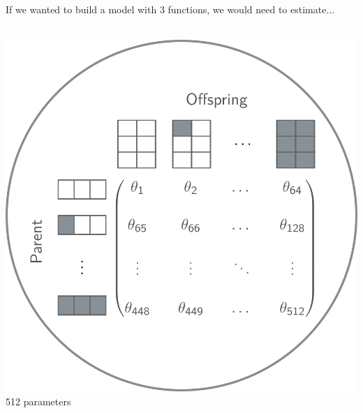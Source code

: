 \documentclass[aspectratio=169,9pt,handout]{beamer}
\begin{document}
\begin{frame}[c,label=aphylo-ergm-example]
	
	\Large If we wanted to build a model with 3 functions, we would need to estimate...\large
	\\\bigskip
	
	\begin{minipage}[t]{.40\linewidth}
		\centering
		\\\bigskip
		\includegraphics[width=.8\linewidth]{aphylo-ergm-eq1.png} \\
		\vfill 512 parameters
	\end{minipage}\hfill
	\begin{minipage}[t]{.19\linewidth}
		\centering 
\end{minipage}
\end{frame}
\end{document}
